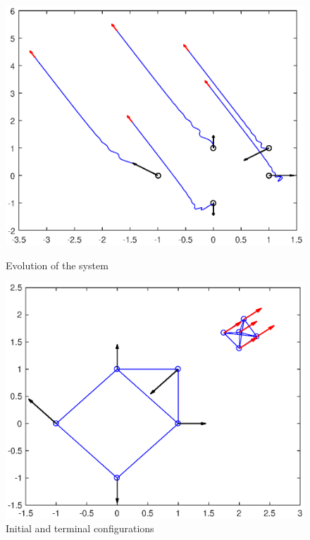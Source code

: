 \documentclass[a4paper, english]{article}
\begin{document}
\begin{figure}[ht]
  \begin{minipage}[b]{0.5\textwidth}
    \includegraphics[width=\textwidth]{figures/a5_D_ev.eps}
    \caption{Evolution of the system}
    \label{ev}
  \end{minipage}
  \hfill
  \begin{minipage}[b]{0.5\textwidth}
    \includegraphics[width=\textwidth]{figures/a5_D_g.eps}
    \caption{Initial and terminal configurations}
    \label{g}
  \end{minipage}
\end{figure}
\end{document}

